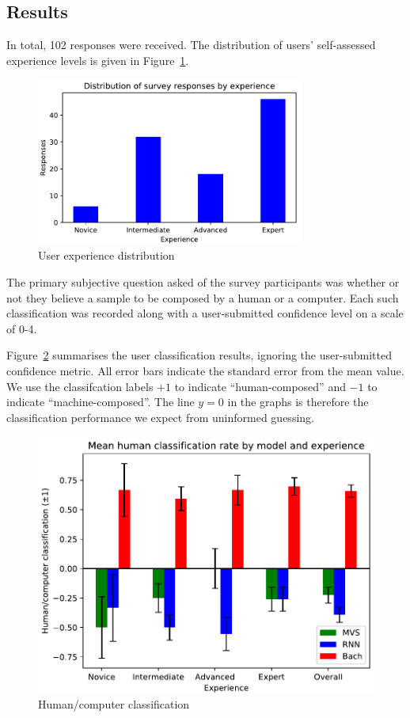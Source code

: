 \documentclass[12pt,a4paper,twoside,openright]{report}
\begin{document}
\subsection{Results}

In total, 102 responses were received. The distribution of users' self-assessed
experience levels is given in Figure~\ref{fig:response-dist}.

\begin{figure}[H]
\centering
\includegraphics[width=250pt]{figs/response_dist.pdf}
\caption{User experience distribution}
\label{fig:response-dist}
\end{figure}

The primary subjective question asked of the survey participants was whether or
not they believe a sample to be composed by a human or a computer. Each such
classification was recorded along with a user-submitted confidence level on a
scale of 0-4.

Figure~\ref{fig:human-classification} summarises the user classification
results, ignoring the user-submitted confidence metric. All error bars indicate
the standard error from the mean value. We use the classifcation labels $+1$ to
indicate ``human-composed'' and $-1$ to indicate ``machine-composed''. The line
$y = 0$ in the graphs is therefore the classification performance we expect from
uninformed guessing.

\begin{figure}[H]
\centering
\includegraphics[width=340pt]{figs/human_classification.pdf}
\caption{Human/computer classification}
\label{fig:human-classification}
\end{figure}
\end{document}
